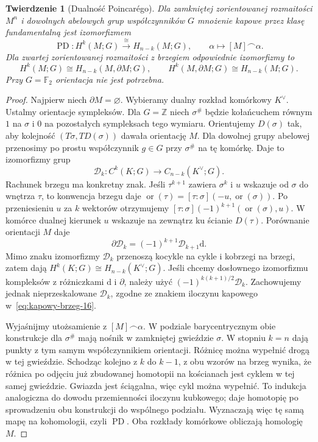 \documentclass[11pt,a4paper,oneside]{report}
\newcommand{\Z}{\mathbb{Z}}
\newcommand{\dd}{\mathrm d}
\theoremstyle{plain}
\newtheorem{twierdzenie}{Twierdzenie}[section]
\theoremstyle{definition}
\theoremstyle{remark}
\begin{document}
\begin{twierdzenie}[Dualność Poincarégo]
\label{thm:poincare-dualnosc-16}
Dla zamkniętej zorientowanej
rozmaitości $M^n$ i dowolnych
abelowych grup współczynników $G$ mnożenie
kapowe przez klasę fundamentalną
jest izomorfizmem
\[
 \operatorname{PD}:H^k(M;G)
       \stackrel{\cong}{\longrightarrow}
       H_{n-k}(M;G),\qquad
 \alpha\longmapsto[M]\frown\alpha.
\]
Dla zwartej zorientowanej
rozmaitości z brzegiem
odpowiednie izomorfizmy to
\[
 H^k(M;G)\cong H_{n-k}(M,\partial M;G),
 \qquad
 H^k(M,\partial M;G)\cong H_{n-k}(M;G).
\]
Przy $G=\mathbb F_2$ orientacja
nie jest potrzebna.
\end{twierdzenie}
\begin{proof}
Najpierw niech $\partial M=\varnothing$.
Wybieramy dualny rozkład komórkowy
$K^\vee$. Ustalmy orientacje sympleksów. Dla $G=\Z$ niech
$\sigma^\#$ będzie kołańcuchem równym $1$ na $\sigma$
i $0$ na pozostałych sympleksach tego wymiaru.
Orientujemy $D(\sigma)$ tak, aby kolejność
$(T\sigma,TD(\sigma))$ dawała orientację $M$.
Dla dowolnej grupy abelowej przenosimy po prostu
współczynnik $g\in G$ przy $\sigma^\#$ na tę komórkę.
Daje to izomorfizmy grup
\[
 \mathcal D_k:C^k(K;G)\longrightarrow C_{n-k}(K^\vee;G).
\]
Rachunek brzegu ma konkretny znak. Jeśli $\tau^{k+1}$
zawiera $\sigma^k$ i $u$ wskazuje od $\sigma$ do wnętrza
$\tau$, to konwencja brzegu daje
$\operatorname{or}(\tau)=[\tau:\sigma](-u,\operatorname{or}(\sigma))$.
Po przeniesieniu $u$ za $k$ wektorów otrzymujemy
$[\tau:\sigma](-1)^{k+1}(\operatorname{or}(\sigma),u)$.
W komórce dualnej kierunek $u$ wskazuje na zewnątrz
ku ścianie $D(\tau)$. Porównanie orientacji $M$ daje
\begin{equation}\label{eq:dualny-lancuch-16}
 \partial\mathcal D_k=(-1)^{k+1}\mathcal D_{k+1}\dd.
\end{equation}
Mimo znaku izomorfizmy $\mathcal D_k$ przenoszą
kocykle na cykle i kobrzegi na brzegi, zatem dają
$H^k(K;G)\cong H_{n-k}(K^\vee;G)$.
Jeśli chcemy dosłownego izomorfizmu kompleksów
z różniczkami $\dd$ i $\partial$, należy użyć
$(-1)^{k(k+1)/2}\mathcal D_k$. Zachowujemy jednak
nieprzeskalowane $\mathcal D_k$, zgodne ze znakiem
iloczynu kapowego w~\eqref{eq:kapowy-brzeg-16}.

Wyjaśnijmy utożsamienie z $[M]\frown\alpha$.
W podziale barycentrycznym obie konstrukcje dla
$\sigma^\#$ mają nośnik w zamkniętej gwieździe $\sigma$.
W stopniu $k=n$ dają punkty z tym samym współczynnikiem
orientacji. Różnicę można wypełnić drogą w tej gwieździe.
Schodząc kolejno z $k$ do $k-1$, z obu wzorów na brzeg
wynika, że różnica po odjęciu już zbudowanej homotopii
na kościanach jest cyklem w tej samej gwieździe.
Gwiazda jest ściągalna, więc cykl można wypełnić.
To indukcja analogiczna do dowodu przemienności
iloczynu kubkowego; daje homotopię po sprowadzeniu
obu konstrukcji do wspólnego podziału. Wyznaczają
więc tę samą mapę na kohomologii, czyli $\operatorname{PD}$.
Oba rozkłady komórkowe obliczają homologię $M$.


\end{proof}
\end{document}

